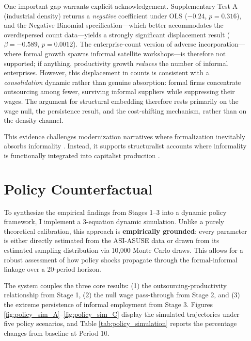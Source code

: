 One important gap warrants explicit acknowledgement. Supplementary Test A (industrial density) returns a \textit{negative} coefficient under OLS ($-0.24$, $p=0.316$), and the Negative Binomial specification---which better accommodates the overdispersed count data---yields a strongly significant displacement result ($\beta = -0.589$, $p = 0.0012$). The enterprise-count version of adverse incorporation---where formal growth spawns informal satellite workshops---is therefore not supported; if anything, productivity growth \textit{reduces} the number of informal enterprises. However, this displacement in counts is consistent with a \textit{consolidation} dynamic rather than genuine absorption: formal firms concentrate outsourcing among fewer, surviving informal suppliers while suppressing their wages. The argument for structural embedding therefore rests primarily on the wage null, the persistence result, and the cost-shifting mechanism, rather than on the density channel.

This evidence challenges modernization narratives where formalization inevitably absorbs informality \autocite{Lewis1954, LaPorta2014}. Instead, it supports structuralist accounts where informality is functionally integrated into capitalist production \autocite{Portes1989, milbergwinkler}.

\clearpage
\section{Policy Counterfactual}
\label{sec:simulation_results}

To synthesize the empirical findings from Stages 1--3 into a dynamic policy framework, I implement a 3-equation dynamic simulation. Unlike a purely theoretical calibration, this approach is \textbf{empirically grounded}: every parameter is either directly estimated from the ASI-ASUSE data or drawn from its estimated sampling distribution via 10,000 Monte Carlo draws. This allows for a robust assessment of how policy shocks propagate through the formal-informal linkage over a 20-period horizon.

The system couples the three core results: (1) the outsourcing-productivity relationship from Stage 1, (2) the null wage pass-through from Stage 2, and (3) the extreme persistence of informal employment from Stage 3. Figures \ref{fig:policy_sim_A}--\ref{fig:policy_sim_C} display the simulated trajectories under five policy scenarios, and Table \ref{tab:policy_simulation} reports the percentage changes from baseline at Period 10.

